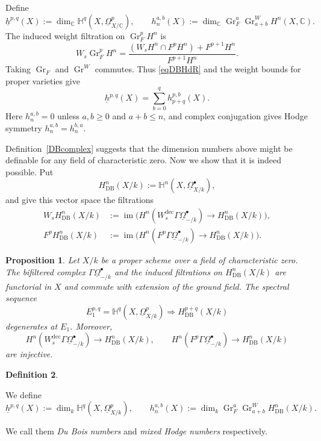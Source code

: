 \documentclass{amsart}
\theoremstyle{plain}
\newtheorem{prop}{Proposition}[section]
\theoremstyle{definition}
\newtheorem{defi}[prop]{Definition}
\DeclareMathOperator{\Gr}{Gr}
\DeclareMathOperator{\im}{im}
\newcommand{\DB}{\mathrm{DB}}
\begin{document}
Define
\[
\underline h^{p,q}(X):=
 \dim_{\mathbb C}\mathbb H^q(X,\underline\Omega^p_{X/\mathbb C}),
\qquad
h_n^{a,b}(X):=
 \dim_{\mathbb C}\Gr_F^a
 \Gr_{a+b}^WH^n(X,\mathbb C).
\]
The induced weight filtration on $\Gr_F^pH^n$ is
\[
W_s\Gr_F^pH^n
 =\frac{(W_sH^n\cap F^pH^n)+F^{p+1}H^n}{F^{p+1}H^n}.
\]
Taking $\Gr_F$ and $\Gr^W$ commutes. Thus
\eqref{eqDBHdR} and the weight bounds for proper varieties give
\begin{equation}\label{eqHodgepiecedim}
\underline h^{p,q}(X)=\sum_{b=0}^{q}h_{p+q}^{p,b}(X).
\end{equation}
Here $h_n^{a,b}=0$ unless $a,b\geq0$ and $a+b\leq n$, and complex conjugation gives Hodge symmetry $h_n^{a,b}=h_n^{b,a}$.


\medskip

Definition~\ref{DBcomplex} suggests that the dimension numbers above might be definable for any field of characteristic zero. Now we show that it is indeed possible. Put
\[
H^n_{\DB}(X/k):=
 \mathbb H^n(X,\underline\Omega^\bullet_{X/k}),
\]
and give this vector space the filtrations
\[
\begin{aligned}
W_sH^n_{\DB}(X/k)
&:=\im\bigl(H^n(W^{\mathrm{dec}}_s
     \Gamma\underline\Omega^\bullet_{-/k})
     \to H^n_{\DB}(X/k)\bigr),\\
F^pH^n_{\DB}(X/k)
&:=\im\bigl(H^n(F^p\Gamma\underline\Omega^\bullet_{-/k})
     \to H^n_{\DB}(X/k)\bigr).
\end{aligned}
\]

\begin{prop}\label{DBHodgecharzero}
Let $X/k$ be a proper scheme over a field of characteristic zero.
The bifiltered complex $\Gamma\underline\Omega^\bullet_{-/k}$ and the induced filtrations on
$H^n_{\DB}(X/k)$ are functorial in $X$ and commute with extension of the ground field. The spectral sequence
\[
E_1^{p,q}=\mathbb H^q(X,\underline\Omega^p_{X/k})
 \Longrightarrow H^{p+q}_{\DB}(X/k)
\]
degenerates at $E_1$. Moreover,
\[
H^n(W^{\mathrm{dec}}_s\Gamma\underline\Omega^\bullet_{-/k})\longrightarrow H^n_{\DB}(X/k),
\qquad
H^n(F^p\Gamma\underline\Omega^\bullet_{-/k})\longrightarrow H^n_{\DB}(X/k)
\]
are injective.

\end{prop}



\begin{defi}\label{numbersdefi}

We define
\[
\underline h^{p,q}(X):=
 \dim_k\mathbb H^q(X,\underline\Omega^p_{X/k}),
\qquad
h_n^{a,b}(X):=
 \dim_k\Gr_F^a\Gr_{a+b}^W
 H^n_{\DB}(X/k).
\]

We call them \emph{Du Bois numbers} and \emph{mixed Hodge numbers} respectively.
    
\end{defi}
\end{document}
